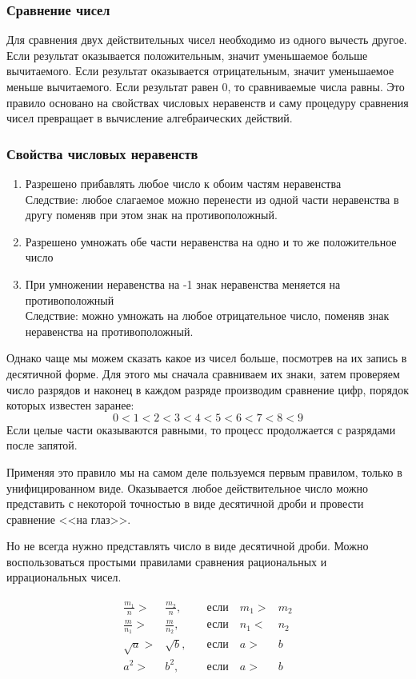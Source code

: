 \documentclass[algebra,twocolumn]{pum}
\date{07.04.20}
\begin{document}
\subsubsection*{Сравнение чисел}
Для сравнения двух действительных чисел необходимо из одного вычесть другое. Если результат оказывается положительным, значит уменьшаемое больше вычитаемого. Если результат оказывается отрицательным, значит уменьшаемое меньше вычитаемого. Если результат равен 0, то сравниваемые числа равны. Это правило основано на свойствах числовых неравенств и саму процедуру сравнения чисел превращает в вычисление алгебраических действий.

\subsubsection*{Свойства числовых неравенств}
\begin{enumerate}[nosep]
  \item Разрешено прибавлять любое число к обоим частям неравенства \\
    Следствие: любое слагаемое можно перенести из одной части неравенства в другу поменяв при этом знак на противоположный.
  \item Разрешено умножать обе части неравенства на одно и то же положительное число
  \item При умножении неравенства на -1 знак неравенства меняется на противоположный \\
    Следствие: можно умножать на любое отрицательное число, поменяв знак неравенства на противоположный.
\end{enumerate}

Однако чаще мы можем сказать какое из чисел больше, посмотрев на их запись в десятичной форме. Для этого мы сначала сравниваем их знаки, затем проверяем число разрядов и наконец в каждом разряде производим сравнение цифр, порядок которых известен заранее:
$$0<1<2<3<4<5<6<7<8<9$$
Если целые части оказываются равными, то процесс продолжается с разрядами после запятой.

Применяя это правило мы на самом деле пользуемся первым правилом, только в унифицированном виде. Оказывается любое действительное число можно представить с некоторой точностью в виде десятичной дроби и провести сравнение <<на глаз>>.

Но не всегда нужно представлять число в виде десятичной дроби. Можно воспользоваться простыми правилами сравнения рациональных и иррациональных чисел.

\begin{gather*}
  \begin{aligned}
    \frac{m_1}{n}>&\frac{m_2}{n},&\quad\text{если}\quad m_1>&m_2 \\
    \frac{m}{n_1}>&\frac{m}{n_2},&\quad\text{если}\quad n_1<&n_2 \\
    \sqrt{a}>&\sqrt{b},&\quad\text{если}\quad a>&b \\
    a^2>&b^2,&\quad\text{если}\quad a>&b
  \end{aligned}
\end{gather*}
\end{document}
